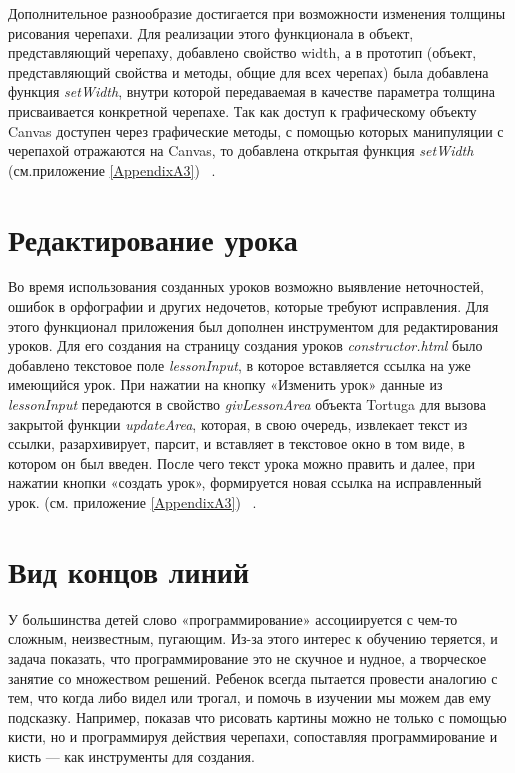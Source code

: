 Дополнительное разнообразие достигается при возможности изменения толщины рисования черепахи. Для реализации этого функционала в объект, представляющий черепаху, добавлено свойство width, а в прототип (объект, представляющий свойства и методы, общие для всех черепах) была добавлена функция \textit{setWidth}, внутри которой передаваемая в качестве параметра толщина присваивается конкретной черепахе. Так как доступ к графическому объекту Canvas доступен через графические методы, с помощью которых манипуляции с черепахой отражаются на Canvas, то добавлена открытая функция \textit{setWidth} (см.приложение \ref{AppendixA3}) ~\cite{prototype}.

\section{Редактирование урока} \label{sect1_1}

Во время использования созданных уроков возможно выявление  неточностей, ошибок в орфографии и других недочетов, которые требуют исправления. Для этого функционал приложения был дополнен инструментом для редактирования уроков. Для его создания на страницу создания уроков \textit{constructor.html} было добавлено текстовое поле \textit{lessonInput}, в которое вставляется ссылка на уже имеющийся урок. При нажатии на кнопку «Изменить урок» данные из \textit{lessonInput} передаются в свойство \textit{givLessonArea} объекта Tortuga для вызова закрытой функции \textit{updateArea}, которая, в свою очередь,  извлекает текст из ссылки, разархивирует, парсит, и вставляет в текстовое окно в том виде, в котором он был введен. После чего текст урока можно править и далее, при нажатии кнопки «создать урок», формируется новая ссылка на исправленный урок. (см. приложение \ref{AppendixA3}) ~\cite{elementsdom, string}.


\section{Вид концов линий} \label{sect1_1}
У большинства детей  слово «программирование» ассоциируется с чем-то сложным, неизвестным, пугающим. Из-за этого интерес к обучению теряется, и задача показать, что программирование это не скучное и нудное, а творческое занятие со множеством решений. Ребенок всегда пытается провести аналогию с тем, что когда либо видел или трогал, и помочь в изучении мы можем дав ему подсказку. Например, показав что рисовать картины можно не только с помощью  кисти, но и программируя действия черепахи, сопоставляя программирование и  кисть --- как инструменты для создания.

